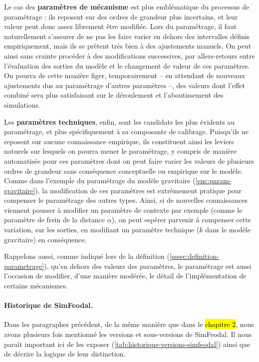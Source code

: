 Le cas des \textbf{paramètres de mécanisme} est plus emblématique du processus de paramétrage : ils reposent sur des ordres de grandeur plus incertains, et leur valeur peut donc assez librement être modifiée.
Lors du paramétrage, il faut naturellement s'assurer de ne pas les faire varier en dehors des intervalles définis empiriquement, mais ils se prêtent très bien à des ajustements manuels.
On peut ainsi sans crainte procéder à des modifications successives, par allers-retours entre l'évaluation des sorties du modèle et le changement de valeur de ces paramètres.
On pourra de cette manière figer, temporairement -- en attendant de nouveaux ajustements dus au paramétrage d'autres paramètres --, des valeurs dont l'effet combiné sera plus satisfaisant sur le déroulement et l'aboutissement des simulations.

Les \textbf{paramètres techniques}, enfin, sont les candidats les plus évidents au paramétrage, et plus spécifiquement à sa composante de calibrage.
Puisqu'ils ne reposent sur aucune connaissance empirique, ils constituent ainsi les \og leviers\fg{} naturels sur lesquels on pourra mener le paramétrage, y compris de manière automatisée pour ces paramètres dont on peut faire varier les valeurs de plusieurs ordres de grandeur sans conséquence conceptuelle ou empirique sur le modèle.
Comme dans l'exemple du paramétrage du modèle gravitaire (\cref{enc:param-gravitaire}), la modification de ces paramètres est extrêmement pratique pour compenser le paramétrage des autres types.
Ainsi, si de nouvelles connaissances viennent pousser à modifier un paramètre de contexte par exemple (comme le paramètre de frein de la distance $\alpha$), on peut espérer parvenir à compenser cette variation, sur les sorties, en modifiant un paramètre technique ($k$ dans le modèle gravitaire) en conséquence.

Rappelons aussi, comme indiqué lors de la définition (\cref{sssec:definition-parametrage}), qu'en dehors des valeurs des paramètres, le paramétrage est aussi l'occasion de modifier, d'une manière modérée, le détail de l'implémentation de certains mécanismes.


\paragraph{Historique de SimFeodal.}

Dans les paragraphes précédent, de la même manière que dans le \hl{chapitre 2}, nous avons plusieurs fois mentionné les versions et sous-versions de SimFeodal.
Il nous paraît important ici de les exposer (\cref{tab:historique-versions-simfeodal}) ainsi que de décrire la logique de leur distinction.

